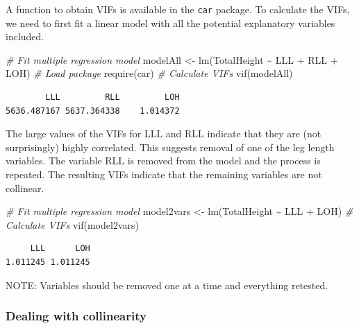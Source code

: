 \documentclass[
  oneside]{krantz}
\newenvironment{Shaded}{\begin{snugshade}}{\end{snugshade}}
\newcommand{\CommentTok}[1]{\textcolor[rgb]{0.56,0.35,0.01}{\textit{#1}}}
\newcommand{\FunctionTok}[1]{\textcolor[rgb]{0.00,0.00,0.00}{#1}}
\newcommand{\NormalTok}[1]{#1}
\newcommand{\OtherTok}[1]{\textcolor[rgb]{0.56,0.35,0.01}{#1}}
\newcommand{\SpecialCharTok}[1]{\textcolor[rgb]{0.00,0.00,0.00}{#1}}
\begin{document}
A function to obtain VIFs is available in the \texttt{car} package. To calculate the VIFs, we need to first fit a linear model with all the potential explanatory variables included.

\begin{Shaded}
\begin{Highlighting}[]
\CommentTok{\# Fit multiple regression model}
\NormalTok{modelAll }\OtherTok{\textless{}{-}} \FunctionTok{lm}\NormalTok{(TotalHeight }\SpecialCharTok{\textasciitilde{}}\NormalTok{ LLL }\SpecialCharTok{+}\NormalTok{ RLL }\SpecialCharTok{+}\NormalTok{ LOH)}
\CommentTok{\# Load package}
\FunctionTok{require}\NormalTok{(car)}
\CommentTok{\# Calculate VIFs}
\FunctionTok{vif}\NormalTok{(modelAll)}
\end{Highlighting}
\end{Shaded}

\begin{verbatim}
        LLL         RLL         LOH 
5636.487167 5637.364338    1.014372 
\end{verbatim}

The large values of the VIFs for LLL and RLL indicate that they are (not surprisingly) highly correlated. This suggests removal of one of the leg length variables. The variable RLL is removed from the model and the process is repeated. The resulting VIFs indicate that the remaining variables are not collinear.

\begin{Shaded}
\begin{Highlighting}[]
\CommentTok{\# Fit multiple regression model}
\NormalTok{model2vars }\OtherTok{\textless{}{-}} \FunctionTok{lm}\NormalTok{(TotalHeight }\SpecialCharTok{\textasciitilde{}}\NormalTok{ LLL }\SpecialCharTok{+}\NormalTok{ LOH)}
\CommentTok{\# Calculate VIFs}
\FunctionTok{vif}\NormalTok{(model2vars)}
\end{Highlighting}
\end{Shaded}

\begin{verbatim}
     LLL      LOH 
1.011245 1.011245 
\end{verbatim}

NOTE: Variables should be removed one at a time and everything retested.

\hypertarget{dealing-with-collinearity}{%
\subsubsection{Dealing with collinearity}\label{dealing-with-collinearity}}
\end{document}

